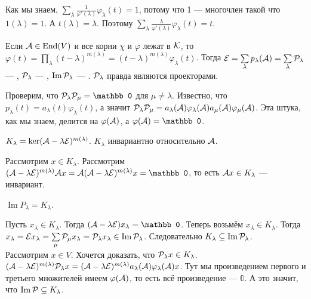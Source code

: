 \documentclass{article}
\DeclareMathOperator{\operIm}{Im}
\let\Im\operIm
\newcommand{\id}{{\mathcal{E}}}
\begin{document}
\begin{itemize}
\begin{Proof}
            Как мы знаем, $\sum\limits_\lambda\frac{1}{\varphi'(\lambda)}\varphi_\lambda(t)=1$, потому что 1 --- многочлен такой что $1(\lambda)=1$. А $t(\lambda)=\lambda$. Поэтому $\sum\limits_\lambda\frac{\lambda}{\varphi'(\lambda)}\varphi_\lambda(t)=t$.
        \end{Proof}
        \dfn Если ${\mathcal{A}}\in\operatorname{End}(V)$ и все корни $\chi$ и $\varphi$ лежат в ${\mathcal{K}}$, то $\varphi(t)=\prod\limits_\lambda(t-\lambda)^{m(\lambda)}=(t-\lambda)^{m(\lambda)}\varphi_\lambda(t)$. Тогда $\id=\sum\limits_\lambda p_\lambda(\scriptA)=\sum\limits_\lambda \scriptP_\lambda$ --- , ${\mathcal{P}}_\lambda$ --- , $\Im\scriptP_\lambda$ --- .
        \thm ${\mathcal{P}}_\lambda$ правда являются проекторами.
        \begin{Proof}
            Проверим, что $\scriptP_\lambda\scriptP_\mu=\mathbb0$ для $\mu\neq\lambda$. Известно, что $p_\lambda(t)=a_\lambda(t)\varphi_\lambda(t)$, а значит ${\mathcal{P}}_\lambda{\mathcal{P}}_\mu=a_\lambda({\mathcal{A}})\varphi_\lambda({\mathcal{A}})a_\mu({\mathcal{A}})\varphi_\mu({\mathcal{A}})$. Эта штука, как мы знаем, делится на $\varphi({\mathcal{A}})$, а $\varphi(\scriptA)=\mathbb0$.
        \end{Proof} 
        \dfn {} $K_\lambda=\ker(\scriptA-\lambda\id)^{m(\lambda)}$.
        \thm $K_\lambda$ инвариантно относительно ${\mathcal{A}}$.
        \begin{Proof}
            Рассмотрим $x\in K_\lambda$. Рассмотрим $(\scriptA-\lambda\id)^{m(\lambda)}\scriptA x=\scriptA(\scriptA-\lambda\id)^{m(\lambda)}x=\mathbb0$, то есть ${\mathcal{A}} x\in K_\lambda$ --- инвариант.
        \end{Proof}
        \thm $\Im P_\lambda=K_\lambda$.
        \begin{Proof}
            Пусть $x_\lambda\in K_\lambda$. Тогда $(\scriptA-\lambda\id)x_\lambda=\mathbb0$. Теперь возьмём $x_\lambda\in K_\lambda$. Тогда $x_\lambda=\id x_\lambda=\sum\limits_{\mu}\scriptP_\mu x_\lambda=\scriptP_\lambda x_\lambda\in\Im\scriptP_\lambda$. Следовательно $K_\lambda\subseteq\Im\scriptP_\lambda$.\\
            Рассмотрим $x\in V$. Хочется доказать, что ${\mathcal{P}}_\lambda x\in K_\lambda$. $(\scriptA-\lambda\id)^{m(\lambda)}\scriptP_\lambda x=(\scriptA-\lambda\id)^{m(\lambda)}a_\lambda(\scriptA)\varphi_\lambda(\scriptA)x$. Тут мы произведением первого и третьего множителей имеем $\varphi({\mathcal{A}})$, то есть всё произведение --- $\mathbb0$. А это значит, что $\Im\scriptP\subseteq K_\lambda$.

\end{Proof}
\end{itemize}
\end{document}
